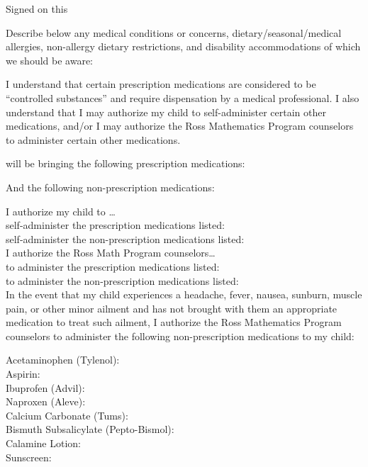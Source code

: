 \documentclass{ross}
\begin{document}
\vfill

Signed  on this 

\pagebreak\null\vspace{-1in}

Describe below any medical conditions or concerns,
dietary/seasonal/medical allergies, non-allergy dietary restrictions,
and disability accommodations of which we should be aware:

\vspace{0.4in}

I understand that certain prescription medications are considered to
be ``controlled substances'' and require dispensation by a medical
professional. I also understand that I may authorize my child to
self-administer certain other medications, and/or I may authorize the
Ross Mathematics Program counselors to administer certain other
medications.

 will be bringing the following prescription medications:

\vspace{0.4in}

And the following non-prescription medications:

\vspace{0.7in}

I authorize my child to \ldots \\
self-administer the \phantom{non-}prescription medications listed:   \\
self-administer the non-prescription medications listed:   \\

I authorize the Ross Math Program counselors\ldots\\
to administer the \phantom{non-}prescription medications listed:   \\
to administer the non-prescription medications listed:   \\

In the event that my child experiences a headache, fever, nausea,
sunburn, muscle pain, or other minor ailment and has not brought with
them an appropriate medication to treat such ailment, I authorize the
Ross Mathematics Program counselors to administer the following
non-prescription medications to my child:

  Acetaminophen (Tylenol):   \\
  Aspirin:   \\
  Ibuprofen (Advil):    \\ 
  Naproxen (Aleve):    \\
  Calcium Carbonate (Tums):   \\
  Bismuth Subsalicylate (Pepto-Bismol):    \\
  Calamine Lotion:   \\ 
  Sunscreen:    \\
\end{document}
